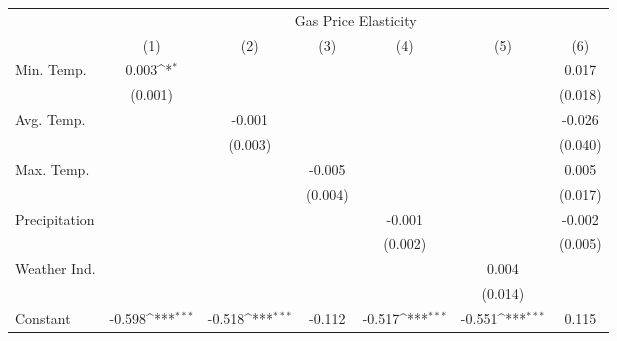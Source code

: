 {
\def\sym#1{\ifmmode^{#1}\else\(^{#1}\)\fi}
\begin{tabular}{l*{6}{c}}
\hline\hline
            &\multicolumn{6}{c}{Gas Price Elasticity}                                                                                           \\
            &\multicolumn{1}{c}{(1)}         &\multicolumn{1}{c}{(2)}         &\multicolumn{1}{c}{(3)}         &\multicolumn{1}{c}{(4)}         &\multicolumn{1}{c}{(5)}         &\multicolumn{1}{c}{(6)}         \\
\hline
Min. Temp.  &       0.003\sym{*}  &                     &                     &                     &                     &       0.017         \\
            &     (0.001)         &                     &                     &                     &                     &     (0.018)         \\
[1em]
Avg. Temp.  &                     &      -0.001         &                     &                     &                     &      -0.026         \\
            &                     &     (0.003)         &                     &                     &                     &     (0.040)         \\
[1em]
Max. Temp.  &                     &                     &      -0.005         &                     &                     &       0.005         \\
            &                     &                     &     (0.004)         &                     &                     &     (0.017)         \\
[1em]
Precipitation&                     &                     &                     &      -0.001         &                     &      -0.002         \\
            &                     &                     &                     &     (0.002)         &                     &     (0.005)         \\
[1em]
Weather Ind.&                     &                     &                     &                     &       0.004         &                     \\
            &                     &                     &                     &                     &     (0.014)         &                     \\
[1em]
Constant    &      -0.598\sym{***}&      -0.518\sym{***}&      -0.112         &      -0.517\sym{***}&      -0.551\sym{***}&       0.115         \\

\end{tabular}}

